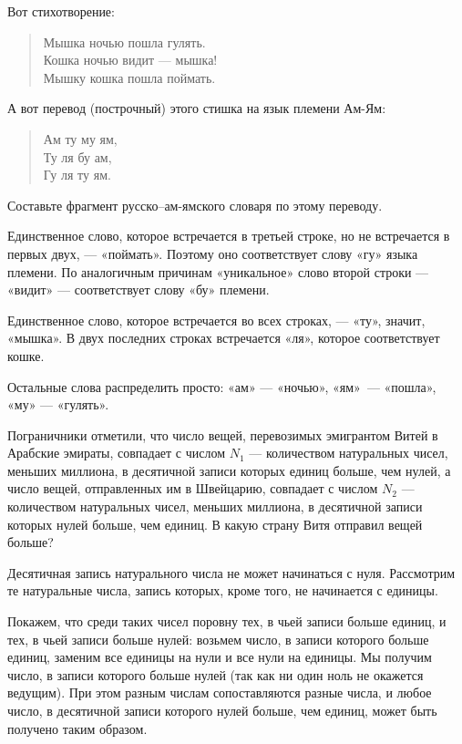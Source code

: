 \begin{itemize}

	\itA Вот стихотворение:

\begin{quote}
Мышка ночью пошла гулять. \\
Кошка ночью видит --- мышка! \\
Мышку кошка пошла поймать.
\end{quote}

А вот перевод (построчный) этого стишка на язык племени Ам-Ям:

\begin{quote}
Ам ту му ям, \\
Ту ля бу ам, \\
Гу ля ту ям.
\end{quote}

Составьте фрагмент русско--ам-ямского словаря по этому переводу.

	\itr Единственное слово, которое встречается в третьей строке, но не встречается в первых двух, — «поймать». Поэтому оно соответствует слову «гу» языка племени. По аналогичным причинам «уникальное» слово второй строки — «видит» — соответствует слову «бу» племени.
	
	Единственное слово, которое встречается во всех строках, — «ту», значит, «мышка». В двух последних строках встречается «ля», которое соответствует кошке.
	
	Остальные слова распределить просто: «ам» — «ночью», «ям»~— «пошла», «му» — «гулять».

	\itC Пограничники отметили, что число вещей, перевозимых эмигрантом  Витей в Арабские эмираты, совпадает с числом $N_1$ --- количеством натуральных чисел, меньших миллиона, в десятичной записи которых единиц больше, чем нулей, а число вещей, отправленных им в Швейцарию, совпадает с числом $N_2$ --- количеством натуральных чисел, меньших миллиона, в десятичной записи которых нулей больше, чем единиц. В какую страну Витя отправил вещей больше?
	
	\itr Десятичная запись натурального числа не может начинаться с нуля. Рассмотрим те натуральные числа, запись которых, кроме того, не начинается с единицы.
	
	Покажем, что среди таких чисел поровну тех, в чьей записи больше единиц, и тех, в чьей записи больше нулей: возьмем число, в записи которого больше единиц, заменим все единицы на нули и все нули на единицы. Мы получим число, в записи которого больше нулей (так как ни один ноль не окажется ведущим). При этом разным числам сопоставляются разные числа, и любое число, в десятичной записи которого нулей больше, чем единиц, может быть получено таким образом.
	

\end{itemize}

